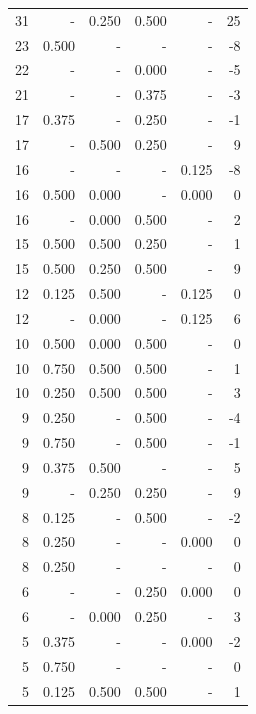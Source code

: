 \documentclass[a4paper]{article}\usepackage{graphicx, color}
\begin{document}
\begin{table}[ht]
\begin{tabular}{rrrrrr}
   \rowcolor{badColor} 31 & - & 0.250 & 0.500 & - & 25 \\ 
   \rowcolor{nullColor} 23 & 0.500 & - & - & - & -8 \\ 
   \rowcolor{sosoColor} 22 & - & - & 0.000 & - & -5 \\ 
   \rowcolor{sosoColor} 21 & - & - & 0.375 & - & -3 \\ 
   \rowcolor{sosoColor} 17 & 0.375 & - & 0.250 & - & -1 \\ 
   \rowcolor{badColor} 17 & - & 0.500 & 0.250 & - & 9 \\ 
   \rowcolor{nullColor} 16 & - & - & - & 0.125 & -8 \\ 
  16 & 0.500 & 0.000 & - & 0.000 & 0 \\ 
   \rowcolor{badColor} 16 & - & 0.000 & 0.500 & - & 2 \\ 
   \rowcolor{badColor} 15 & 0.500 & 0.500 & 0.250 & - & 1 \\ 
   \rowcolor{badColor} 15 & 0.500 & 0.250 & 0.500 & - & 9 \\ 
  12 & 0.125 & 0.500 & - & 0.125 & 0 \\ 
  12 & - & 0.000 & - & 0.125 & 6 \\ 
   \rowcolor{badColor} 10 & 0.500 & 0.000 & 0.500 & - & 0 \\ 
   \rowcolor{goodColor} 10 & 0.750 & 0.500 & 0.500 & - & 1 \\ 
   \rowcolor{goodColor} 10 & 0.250 & 0.500 & 0.500 & - & 3 \\ 
   \rowcolor{sosoColor} 9 & 0.250 & - & 0.500 & - & -4 \\ 
   \rowcolor{sosoColor} 9 & 0.750 & - & 0.500 & - & -1 \\ 
  9 & 0.375 & 0.500 & - & - & 5 \\ 
   \rowcolor{goodColor} 9 & - & 0.250 & 0.250 & - & 9 \\ 
   \rowcolor{sosoColor} 8 & 0.125 & - & 0.500 & - & -2 \\ 
   \rowcolor{nullColor} 8 & 0.250 & - & - & 0.000 & 0 \\ 
   \rowcolor{nullColor} 8 & 0.250 & - & - & - & 0 \\ 
   \rowcolor{sosoColor} 6 & - & - & 0.250 & 0.000 & 0 \\ 
   \rowcolor{badColor} 6 & - & 0.000 & 0.250 & - & 3 \\ 
   \rowcolor{nullColor} 5 & 0.375 & - & - & 0.000 & -2 \\ 
   \rowcolor{nullColor} 5 & 0.750 & - & - & - & 0 \\ 
   \rowcolor{goodColor} 5 & 0.125 & 0.500 & 0.500 & - & 1 \\ 

\end{tabular}
\end{table}
\end{document}
